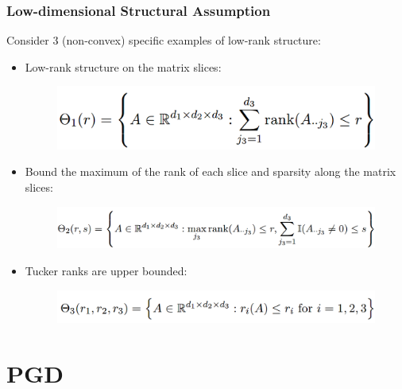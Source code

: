 \documentclass{beamer}
\begin{document}
	
	\begin{frame}
		\frametitle{Low-dimensional Structural Assumption}
		Consider 3 (non-convex) specific examples of low-rank structure:
		\begin{itemize}
			\item 
			Low-rank structure on the matrix slices:
			 \begin{figure}
				\includegraphics[width=.6\linewidth]{image004.png}
			\end{figure}
			\item
			Bound the maximum of the rank of each slice and sparsity along the matrix slices:
			 \begin{figure}
				\includegraphics[width=.8\linewidth]{image005.png}
			\end{figure}
			\item
			Tucker ranks are upper bounded:
			 \begin{figure}
				\includegraphics[width=.7\linewidth]{image006.png}
			\end{figure}
		\end{itemize}
	\end{frame}
	
	\section{PGD}
	
\end{document}
